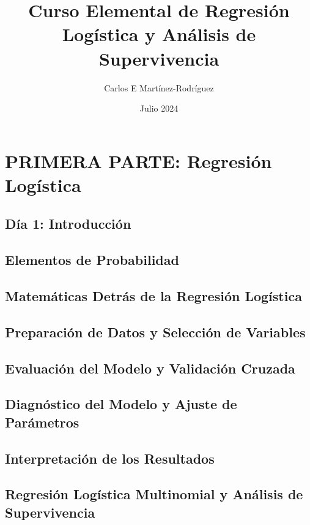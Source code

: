 \documentclass{report}
\title{Curso Elemental de Regresi\'on Logística y Análisis de Supervivencia}
\author{Carlos E Mart\'inez-Rodr\'iguez}
\date{Julio 2024}
\begin{document}
\maketitle

\tableofcontents

\part{PRIMERA PARTE: Regresi\'on Log\'istica}
\chapter{D\'ia 1: Introducci\'on}


\chapter{Elementos de Probabilidad}


\chapter{Matem\'aticas Detr\'as de la Regresi\'on Logística}


\chapter{Preparaci\'on de Datos y Selecci\'on de Variables}


\chapter{Evaluaci\'on del Modelo y Validaci\'on Cruzada}


\chapter{Diagn\'ostico del Modelo y Ajuste de Par\'ametros}


\chapter{Interpretaci\'on de los Resultados}


\chapter{Regresi\'on Logística Multinomial y An\'alisis de Supervivencia}

\end{document}
